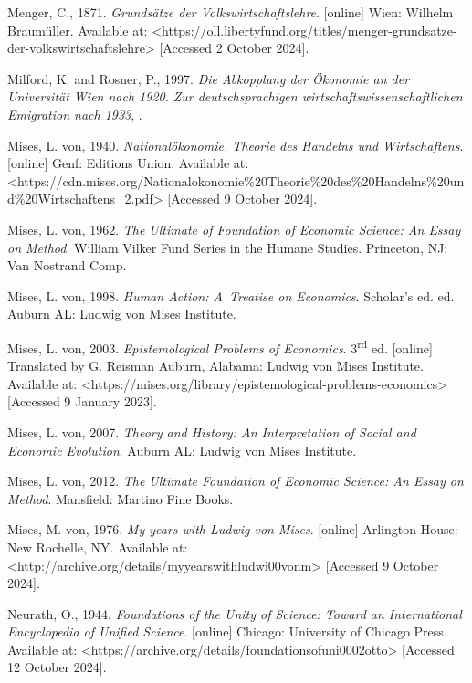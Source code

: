 Menger, C., 1871. \textit{Grundsätze der Volkswirtschaftslehre}. [online] Wien: Wilhelm Braumüller. Available at: {\textless}https://oll.libertyfund.org/titles/menger-grundsatze-der-volkswirtschaftslehre{\textgreater} [Accessed 2 October 2024].



Milford, K. and Rosner, P., 1997. \textit{Die Abkopplung der Ökonomie an der Universität Wien nach 1920.} \textit{Zur deutschsprachigen wirtschaftswissenschaftlichen Emigration nach 1933}, .



Mises, L. von, 1940. \textit{Nationalökonomie. Theorie des Handelns und Wirtschaftens}. [online] Genf: Editions Union. Available at: {\textless}https://cdn.mises.org/Nationalokonomie\%20Theorie\%20des\%20Handelns\%20und\%20Wirtschaftens\_2.pdf{\textgreater} [Accessed 9 October 2024].



Mises, L. von, 1962. \textit{The Ultimate of Foundation of Economic Science: An Essay on Method}. William Vilker Fund Series in the Humane Studies. Princeton, NJ: Van Nostrand Comp.



Mises, L. von, 1998. \textit{Human Action: A~Treatise on Economics}. Scholar's ed. ed. Auburn AL: Ludwig von Mises Institute.



Mises, L. von, 2003. \textit{Epistemological Problems of Economics}. 3\textsuperscript{rd} ed. [online] Translated by G. Reisman Auburn, Alabama: Ludwig von Mises Institute. Available at: {\textless}https://mises.org/library/epistemological-problems-economics{\textgreater} [Accessed 9 January 2023].



Mises, L. von, 2007. \textit{Theory and History: An Interpretation of Social and Economic Evolution}. Auburn AL: Ludwig von Mises Institute.



Mises, L. von, 2012. \textit{The Ultimate Foundation of Economic Science: An Essay on Method}. Mansfield: Martino Fine Books.



Mises, M. von, 1976. \textit{My years with Ludwig von Mises}. [online] Arlington House: New Rochelle, NY. Available at: {\textless}http://archive.org/details/myyearswithludwi00vonm{\textgreater} [Accessed 9 October 2024].



Neurath, O., 1944. \textit{Foundations of the Unity of Science: Toward an International Encyclopedia of Unified Science}. [online] Chicago: University of Chicago Press. Available at: {\textless}https://archive.org/details/foundationsofuni0002otto{\textgreater} [Accessed 12 October 2024].



